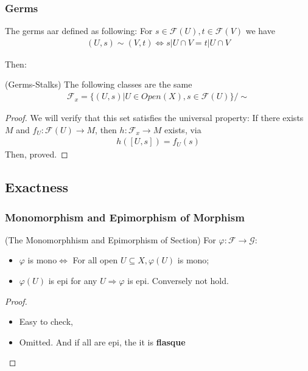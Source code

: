 \documentclass[Total.tex]{subfiles}
\begin{document}
				\subsubsection{Germs}
					\begin{Def}
						The germs aar defined as following: For $s\in \mathcal{F}(U),t\in \mathcal{F}(V)$ we have
						\begin{gather*}
							(U,s)\sim (V,t)\Leftrightarrow s|U\cap V=t|U\cap V
						\end{gather*}
					\end{Def}
					
					Then:
					\begin{proposition}
						(Germs-Stalks) The following classes are the same
						\begin{gather*}
							\mathcal{F}_x=\{(U,s)|U\in Open(X),s\in \mathcal{F}(U)\}/\sim
						\end{gather*}
					\end{proposition}
					\begin{proof}
						We will verify that this set satisfies the universal property: If there exists $M$ and $f_U:\mathcal{F}(U)\rightarrow M$, then $h:\mathcal{F}_x\rightarrow M$ exists, via
						\begin{gather*}
							h([U,s])=f_U(s)
						\end{gather*}
						Then, proved.
					\end{proof}
			\subsection{Exactness}
				\subsubsection{Monomorphism and Epimorphism of Morphism}
					\begin{proposition}
						(The Monomorphhism and Epimorphism of Section) For $\varphi:\mathcal{F}\rightarrow \mathcal{G}$:
						\begin{itemize}
							\item $\varphi$ is mono$\Leftrightarrow$ For all open $U\subseteq X,\varphi(U)$ is mono;
							\item $\varphi(U)$ is epi for any $U\Rightarrow \varphi$ is epi. Conversely not hold.
						\end{itemize}
					\end{proposition}
					\begin{proof}
						\begin{itemize}
							\item Easy to check,
							\item Omitted. And if all are epi, the it is \textbf{flasque}
						\end{itemize}
					\end{proof}
\end{document}
